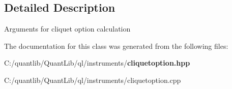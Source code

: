 \subsection{Detailed Description}
Arguments for cliquet option calculation 

The documentation for this class was generated from the following files\+:\begin{DoxyCompactItemize}
\item 
C\+:/quantlib/\+Quant\+Lib/ql/instruments/{\bf cliquetoption.\+hpp}\item 
C\+:/quantlib/\+Quant\+Lib/ql/instruments/cliquetoption.\+cpp\end{DoxyCompactItemize}
